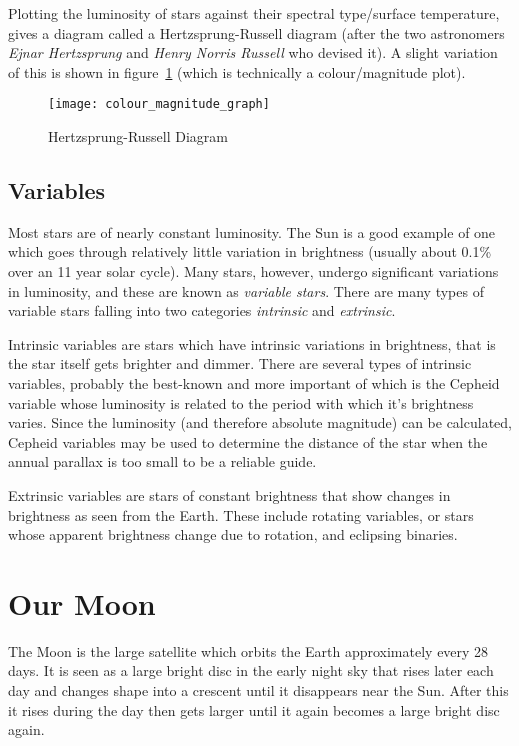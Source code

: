Plotting the luminosity of stars against their spectral type/surface
temperature, gives a diagram called a Hertzsprung-Russell diagram (after
the two astronomers \emph{Ejnar Hertzsprung} and \emph{Henry Norris
Russell} who devised it). A slight variation of this is shown in figure~\ref{fig:colourmag} (which is technically a colour/magnitude plot).

\begin{figure}[tp]
\centering\texttt{[image: colour\_magnitude\_graph]}
\label{fig:colourmag}
\caption{Hertzsprung-Russell Diagram}
\end{figure}

\subsection{Variables}\label{variables}

Most stars are of nearly constant luminosity. The Sun is a good example
of one which goes through relatively little variation in brightness
(usually about 0.1\% over an 11 year solar cycle). Many stars, however,
undergo significant variations in luminosity, and these are known as
\emph{variable stars}. There are many types of variable stars falling
into two categories \emph{intrinsic} and \emph{extrinsic}.

Intrinsic variables are stars which have intrinsic variations in
brightness, that is the star itself gets brighter and dimmer. There are
several types of intrinsic variables, probably the best-known and more
important of which is the Cepheid variable whose luminosity is related
to the period with which it's brightness varies. Since the luminosity
(and therefore absolute magnitude) can be calculated, Cepheid variables
may be used to determine the distance of the star when the annual
parallax is too small to be a reliable guide.

Extrinsic variables are stars of constant brightness that show changes
in brightness as seen from the Earth. These include rotating variables,
or stars whose apparent brightness change due to rotation, and eclipsing
binaries.

\section{Our Moon}\label{our-moon}

The Moon is the large satellite which orbits the Earth approximately
every 28 days. It is seen as a large bright disc in the early night sky
that rises later each day and changes shape into a crescent until it
disappears near the Sun. After this it rises during the day then gets
larger until it again becomes a large bright disc again.

